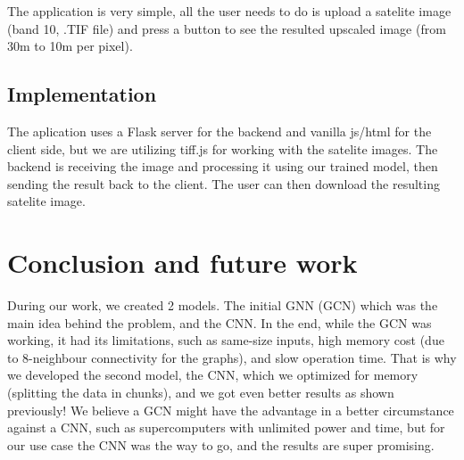 \documentclass[runningheads,a4paper,11pt]{report}
\begin{document}
The application is very simple, all the user needs to do is upload a satelite image (band 10, .TIF file) and press a button to see the resulted upscaled image (from 30m to 10m per pixel).

\section{Implementation}
\label{section:appImplementation}

The aplication uses a Flask server for the backend and vanilla js/html for the client side, but we are utilizing tiff.js for working with the satelite images. The backend is receiving the image and processing it using our trained model, then sending the result back to the client. The user can then download the resulting satelite image.



\chapter{Conclusion and future work}
\label{chapter:concl}

During our work, we created 2 models. The initial GNN (GCN) which was the main idea behind the problem, and the CNN. In the end, while the GCN was working, it had its limitations, such as same-size inputs, high memory cost (due to 8-neighbour connectivity for the graphs), and slow operation time. That is why we developed the second model, the CNN, which we optimized for memory (splitting the data in chunks), and we got even better results as shown previously! We believe a GCN might have the advantage in a better circumstance against a CNN, such as supercomputers with unlimited power and time, but for our use case the CNN was the way to go, and the results are super promising.







\end{document}
